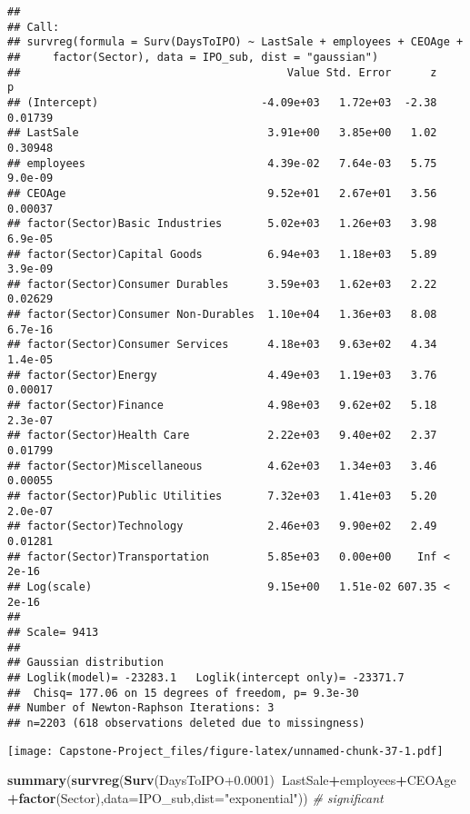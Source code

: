 \documentclass[]{article}
\newenvironment{Shaded}{\begin{snugshade}}{\end{snugshade}}
\newcommand{\CommentTok}[1]{\textcolor[rgb]{0.56,0.35,0.01}{\textit{#1}}}
\newcommand{\DataTypeTok}[1]{\textcolor[rgb]{0.13,0.29,0.53}{#1}}
\newcommand{\FloatTok}[1]{\textcolor[rgb]{0.00,0.00,0.81}{#1}}
\newcommand{\KeywordTok}[1]{\textcolor[rgb]{0.13,0.29,0.53}{\textbf{#1}}}
\newcommand{\NormalTok}[1]{#1}
\newcommand{\OperatorTok}[1]{\textcolor[rgb]{0.81,0.36,0.00}{\textbf{#1}}}
\newcommand{\StringTok}[1]{\textcolor[rgb]{0.31,0.60,0.02}{#1}}
\begin{document}
\begin{verbatim}
## 
## Call:
## survreg(formula = Surv(DaysToIPO) ~ LastSale + employees + CEOAge + 
##     factor(Sector), data = IPO_sub, dist = "gaussian")
##                                         Value Std. Error      z       p
## (Intercept)                         -4.09e+03   1.72e+03  -2.38 0.01739
## LastSale                             3.91e+00   3.85e+00   1.02 0.30948
## employees                            4.39e-02   7.64e-03   5.75 9.0e-09
## CEOAge                               9.52e+01   2.67e+01   3.56 0.00037
## factor(Sector)Basic Industries       5.02e+03   1.26e+03   3.98 6.9e-05
## factor(Sector)Capital Goods          6.94e+03   1.18e+03   5.89 3.9e-09
## factor(Sector)Consumer Durables      3.59e+03   1.62e+03   2.22 0.02629
## factor(Sector)Consumer Non-Durables  1.10e+04   1.36e+03   8.08 6.7e-16
## factor(Sector)Consumer Services      4.18e+03   9.63e+02   4.34 1.4e-05
## factor(Sector)Energy                 4.49e+03   1.19e+03   3.76 0.00017
## factor(Sector)Finance                4.98e+03   9.62e+02   5.18 2.3e-07
## factor(Sector)Health Care            2.22e+03   9.40e+02   2.37 0.01799
## factor(Sector)Miscellaneous          4.62e+03   1.34e+03   3.46 0.00055
## factor(Sector)Public Utilities       7.32e+03   1.41e+03   5.20 2.0e-07
## factor(Sector)Technology             2.46e+03   9.90e+02   2.49 0.01281
## factor(Sector)Transportation         5.85e+03   0.00e+00    Inf < 2e-16
## Log(scale)                           9.15e+00   1.51e-02 607.35 < 2e-16
## 
## Scale= 9413 
## 
## Gaussian distribution
## Loglik(model)= -23283.1   Loglik(intercept only)= -23371.7
##  Chisq= 177.06 on 15 degrees of freedom, p= 9.3e-30 
## Number of Newton-Raphson Iterations: 3 
## n=2203 (618 observations deleted due to missingness)
\end{verbatim}

\texttt{[image: Capstone-Project\_files/figure-latex/unnamed-chunk-37-1.pdf]}

\begin{Shaded}
\begin{Highlighting}[]
\KeywordTok{summary}\NormalTok{(}\KeywordTok{survreg}\NormalTok{(}\KeywordTok{Surv}\NormalTok{(DaysToIPO}\FloatTok{+0.0001}\NormalTok{)}\OperatorTok{~}\NormalTok{LastSale}\OperatorTok{+}\NormalTok{employees}\OperatorTok{+}\NormalTok{CEOAge}\OperatorTok{+}\KeywordTok{factor}\NormalTok{(Sector),}\DataTypeTok{data=}\NormalTok{IPO_sub,}\DataTypeTok{dist=}\StringTok{"exponential"}\NormalTok{)) }\CommentTok{# significant}
\end{Highlighting}
\end{Shaded}
\end{document}
